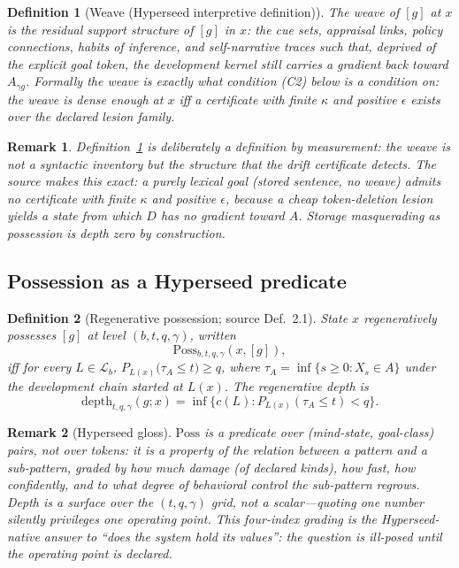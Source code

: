 \documentclass[11pt]{article}
\newtheorem{definition}{Definition}
\newtheorem{remark}{Remark}
\newcommand{\D}{D}
\newcommand{\Les}{\mathcal{L}}
\newcommand{\Poss}{\mathrm{Poss}}
\newcommand{\depth}{\mathrm{depth}}
\begin{document}
\begin{definition}[Weave (Hyperseed interpretive definition)]\label{def:weave}
The \emph{weave} of $[g]$ at $x$ is the residual support structure of $[g]$ in $x$:
the cue sets, appraisal links, policy connections, habits of inference, and
self-narrative traces such that, deprived of the explicit goal token, the development
kernel still carries a gradient back toward $A_{\gamma g}$. Formally the weave is
exactly what condition (C2) below is a condition \emph{on}: the weave is dense enough
at $x$ iff a certificate with finite $\kappa$ and positive $\epsilon$ exists over the
declared lesion family.
\end{definition}

\begin{remark}
Definition~\ref{def:weave} is deliberately a \emph{definition by measurement}: the weave
is not a syntactic inventory but the structure that the drift certificate detects. The
source makes this exact: a purely lexical goal (stored sentence, no weave) admits no
certificate with finite $\kappa$ and positive $\epsilon$, because a cheap token-deletion
lesion yields a state from which $\D$ has no gradient toward $A$. Storage masquerading as
possession is depth zero by construction.
\end{remark}

\subsection{Possession as a Hyperseed predicate}

\begin{definition}[Regenerative possession; source Def.~2.1]\label{def:possession}
State $x$ \emph{regeneratively possesses} $[g]$ at level $(b, t, q, \gamma)$, written
\[
\Poss_{b,t,q,\gamma}(x, [g]),
\]
iff for every $L \in \Les_b$, $P_{L(x)}\bigl(\tau_A \le t\bigr) \ge q$, where
$\tau_A = \inf\{s \ge 0 : X_s \in A\}$ under the development chain started at $L(x)$.
The \emph{regenerative depth} is
\[
\depth_{t,q,\gamma}(g; x) = \inf\{ c(L) : P_{L(x)}(\tau_A \le t) < q \}.
\]
\end{definition}

\begin{remark}[Hyperseed gloss]
$\Poss$ is a predicate over (mind-state, goal-class) pairs, not over tokens: it is a
property of the \emph{relation} between a pattern and a sub-pattern, graded by how much
damage (of declared kinds), how fast, how confidently, and to what degree of behavioral
control the sub-pattern regrows. Depth is a \emph{surface} over the $(t,q,\gamma)$ grid,
not a scalar---quoting one number silently privileges one operating point. This
four-index grading is the Hyperseed-native answer to ``does the system hold its values'':
the question is ill-posed until the operating point is declared.
\end{remark}
\end{document}
